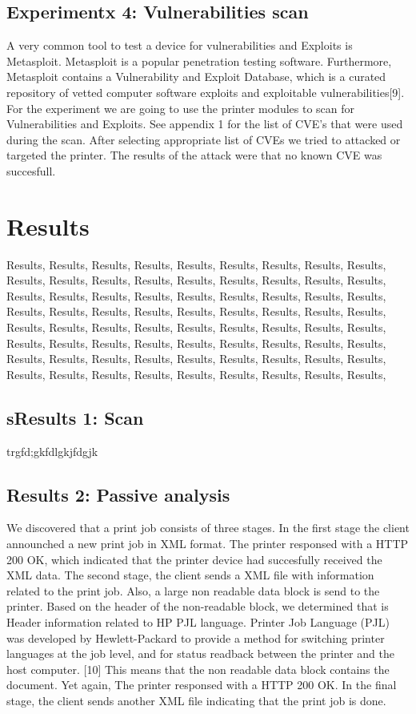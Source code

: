 \documentclass[a4paper]{article}
\begin{document}
\subsection{Experimentx 4: Vulnerabilities scan }
A very common tool to test a device for vulnerabilities and Exploits is
Metasploit. Metasploit is a popular penetration testing software.
Furthermore, Metasploit contains a Vulnerability and Exploit Database,
which is a curated repository of vetted computer software exploits and
exploitable vulnerabilities[9]. For the experiment we are going to use the
printer modules to scan for Vulnerabilities and Exploits. See appendix 1
for the list of CVE's that were used during the scan. After selecting
appropriate list of CVEs we tried to attacked or targeted the printer. The
results of the attack were that no known CVE was succesfull. 

\section{Results} %
\label{Results}
Results, Results, Results, Results, Results, Results, Results, Results, Results, Results, Results, Results, Results, Results, Results, Results, Results, Results, Results, Results, Results, Results, Results, Results, Results, Results, Results, Results, Results, Results, Results, Results, Results, Results, Results, Results, Results, Results, Results, Results, Results, Results, Results, Results, Results, Results, Results, Results, Results, Results, Results, Results, Results, Results, Results, Results, Results, Results, Results, Results, Results, Results, Results, Results, Results, Results, Results, Results, Results, Results, Results, Results, 

\subsection{sResults 1: Scan}
trgfd;gkfdlgkjfdgjk





\subsection{Results 2: Passive analysis}
We discovered that a print job consists of three stages. In the first stage the client announched a new print job in XML format. The printer responsed with a HTTP 200 OK, which indicated that the printer device had succesfully received the XML data. The second stage, the client sends a XML file with information related to the print job. Also, a large non readable data block is send  to the printer. Based
on the header of the non-readable block, we determined that is  Header
information related to HP PJL language. Printer Job Language (PJL) was
developed by Hewlett-Packard to provide a method for switching printer
languages at the job level, and for status readback between the printer
and the host computer. [10] This means that the non readable data block
contains the document. Yet again, The printer responsed with a HTTP 200
OK. In the final stage, the client sends another XML file indicating that
the print job is done.
\end{document}
